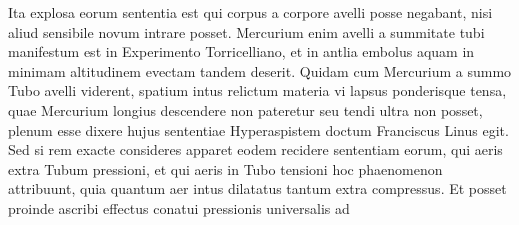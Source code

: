 \pend \pstart%
Ita explosa eorum sententia est qui  corpus a corpore avelli posse negabant, nisi aliud sensibile novum intrare posset. Mercurium  enim avelli a summitate tubi manifestum est in Experimento Torricelliano, et in antlia embolus aquam in minimam altitudinem evectam tandem deserit.%
\pend \pstart %
Quidam  cum Mercurium a summo Tubo avelli viderent,  spatium intus relictum materia vi lapsus  ponderisque tensa, quae Mercurium longius descendere  non pateretur seu tendi ultra non posset,  plenum esse dixere hujus sententiae Hyperaspistem doctum Franciscus Linus egit.  Sed si rem  exacte consideres  apparet eodem recidere sententiam  eorum, qui aeris  extra Tubum pressioni, et  qui aeris in Tubo tensioni  hoc phaenomenon attribuunt, quia quantum  aer intus dilatatus%
tantum extra compressus. Et posset proinde ascribi effectus conatui pressionis universalis ad \pend

